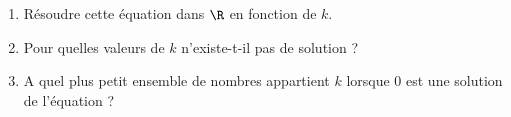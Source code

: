 \documentclass[10pt]{article}
\begin{document}
\begin{enumerate}
\item Résoudre cette équation dans $\R$ en fonction de $k$.
\item Pour quelles valeurs de $k$ n'existe-t-il pas de solution ?
\item A quel plus petit ensemble de nombres appartient $k$ lorsque 0 est une solution de l'équation ?
\end{enumerate}
%
%
%
%
%
%
%
%
% 
%
%
%
%
%
%
%
%
%
% 
%
%
%
% 
%
%
%


%
% 
\end{document}
